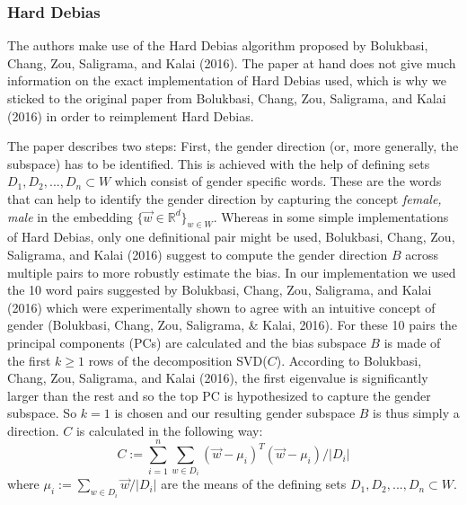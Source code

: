 \documentclass[
  english,
  man,floatsintext]{apa6}
\begin{document}
\hypertarget{hard-debias}{%
\subsubsection{Hard Debias}\label{hard-debias}}

The authors make use of the Hard Debias algorithm proposed by Bolukbasi, Chang, Zou, Saligrama, and Kalai (2016). The paper at hand does not give much information on the exact implementation of Hard Debias used, which is why we sticked to the original paper from Bolukbasi, Chang, Zou, Saligrama, and Kalai (2016) in order to reimplement Hard Debias.

The paper describes two steps: First, the gender direction (or, more generally, the subspace) has to be identified. This is achieved with the help of defining sets \(D_1, D_2, ..., D_n \subset W\) which consist of gender specific words. These are the words that can help to identify the gender direction by capturing the concept \emph{female, male} in the embedding \(\{\vec{w}\in\mathbb{R}^d\}_{w\in W}\). Whereas in some simple implementations of Hard Debias, only one definitional pair might be used, Bolukbasi, Chang, Zou, Saligrama, and Kalai (2016) suggest to compute the gender direction \(B\) across multiple pairs to more robustly estimate the bias. In our implementation we used the 10 word pairs suggested by Bolukbasi, Chang, Zou, Saligrama, and Kalai (2016) which were experimentally shown to agree with an intuitive concept of gender (Bolukbasi, Chang, Zou, Saligrama, \& Kalai, 2016). For these 10 pairs the principal components (PCs) are calculated and the bias subspace \(B\) is made of the first \(k \geq 1\) rows of the decomposition SVD(\(C\)). According to Bolukbasi, Chang, Zou, Saligrama, and Kalai (2016), the first eigenvalue is significantly larger than the rest and so the top PC is hypothesized to capture the gender subspace. So \(k=1\) is chosen and our resulting gender subspace \(B\) is thus simply a direction. \(C\) is calculated in the following way: \[C:=\sum_{i=1}^n \sum_{w\in D_i}(\vec{w}-\mu_i)^T(\vec{w}-\mu_i)/|D_i|\] where \(\mu_i := \sum_{w\in D_i}\vec{w}/|D_i|\) are the means of the defining sets \(D_1, D_2, ..., D_n \subset W\).
\end{document}
